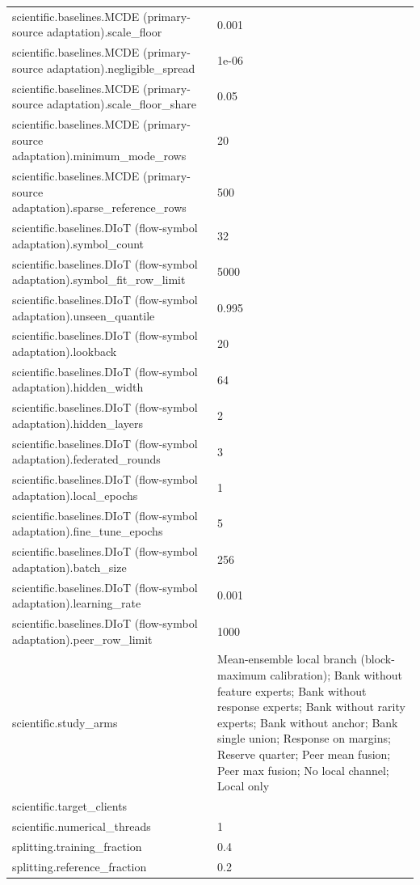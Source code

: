 \begin{tabular}{ll}
scientific.baselines.MCDE (primary-source adaptation).scale\_floor & 0.001 \\
scientific.baselines.MCDE (primary-source adaptation).negligible\_spread & 1e-06 \\
scientific.baselines.MCDE (primary-source adaptation).scale\_floor\_share & 0.05 \\
scientific.baselines.MCDE (primary-source adaptation).minimum\_mode\_rows & 20 \\
scientific.baselines.MCDE (primary-source adaptation).sparse\_reference\_rows & 500 \\
scientific.baselines.DIoT (flow-symbol adaptation).symbol\_count & 32 \\
scientific.baselines.DIoT (flow-symbol adaptation).symbol\_fit\_row\_limit & 5000 \\
scientific.baselines.DIoT (flow-symbol adaptation).unseen\_quantile & 0.995 \\
scientific.baselines.DIoT (flow-symbol adaptation).lookback & 20 \\
scientific.baselines.DIoT (flow-symbol adaptation).hidden\_width & 64 \\
scientific.baselines.DIoT (flow-symbol adaptation).hidden\_layers & 2 \\
scientific.baselines.DIoT (flow-symbol adaptation).federated\_rounds & 3 \\
scientific.baselines.DIoT (flow-symbol adaptation).local\_epochs & 1 \\
scientific.baselines.DIoT (flow-symbol adaptation).fine\_tune\_epochs & 5 \\
scientific.baselines.DIoT (flow-symbol adaptation).batch\_size & 256 \\
scientific.baselines.DIoT (flow-symbol adaptation).learning\_rate & 0.001 \\
scientific.baselines.DIoT (flow-symbol adaptation).peer\_row\_limit & 1000 \\
scientific.study\_arms & Mean-ensemble local branch (block-maximum calibration); Bank without feature experts; Bank without response experts; Bank without rarity experts; Bank without anchor; Bank single union; Response on margins; Reserve quarter; Peer mean fusion; Peer max fusion; No local channel; Local only \\
scientific.target\_clients &  \\
scientific.numerical\_threads & 1 \\
splitting.training\_fraction & 0.4 \\
splitting.reference\_fraction & 0.2 \\

\end{tabular}
